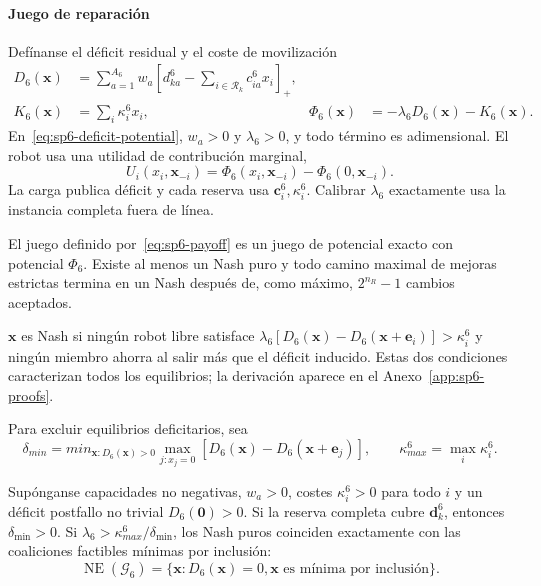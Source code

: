 \paragraph{Juego de reparación}

Defínanse el déficit residual y el coste de movilización
\begin{equation}
\label{eq:sp6-deficit-potential}
\begin{aligned}
 D_6(\boldsymbol x)
 &=\sum_{a=1}^{A_6}w_a
 \left[d_{ka}^6-\sum_{i\in\mathcal R_k}c_{ia}^6x_i\right]_+,\\
 K_6(\boldsymbol x)&=\sum_i\kappa_i^6x_i,
 &\Phi_6(\boldsymbol x)&=-\lambda_6D_6(\boldsymbol x)-K_6(\boldsymbol x).
\end{aligned}
\end{equation}
En~\eqref{eq:sp6-deficit-potential}, $w_a>0$ y $\lambda_6>0$, y todo término es adimensional. El robot usa una utilidad de contribución marginal,
\begin{equation}
\label{eq:sp6-payoff}
 U_i(x_i,\boldsymbol x_{-i})=
 \Phi_6(x_i,\boldsymbol x_{-i})-\Phi_6(0,\boldsymbol x_{-i}).
\end{equation}
La carga publica déficit y cada reserva usa $\boldsymbol c_i^6,\kappa_i^6$. Calibrar $\lambda_6$ exactamente usa la instancia completa fuera de línea.

\begin{teorema}
\label{thm:sp6-exact-potential}
El juego definido por~\eqref{eq:sp6-payoff} es un juego de potencial exacto con potencial $\Phi_6$. Existe al menos un Nash puro y todo camino maximal de mejoras estrictas termina en un Nash después de, como máximo, $2^{n_R}-1$ cambios aceptados.
\end{teorema}

$\boldsymbol x$ es Nash si ningún robot libre satisface
$\lambda_6[D_6(\boldsymbol x)-D_6(\boldsymbol x+\boldsymbol e_i)]>\kappa_i^6$
y ningún miembro ahorra al salir más que el déficit inducido. Estas dos condiciones caracterizan todos los equilibrios; la derivación aparece en el Anexo~\ref{app:sp6-proofs}.

Para excluir equilibrios deficitarios, sea
\begin{equation}
\label{eq:sp6-delta-min}
 \delta_{min}=min_{\boldsymbol x:D_6(\boldsymbol x)>0}
 \max_{j:x_j=0}\left[D_6(\boldsymbol x)-D_6(\boldsymbol x+\boldsymbol e_j)\right],
 \qquad
 \kappa_{max}^6=\max_i\kappa_i^6.
\end{equation}

\begin{teorema}
\label{thm:sp6-feasible-nash}
Supónganse capacidades no negativas, $w_a>0$, costes $\kappa_i^6>0$ para todo $i$ y un déficit postfallo no trivial $D_6(\boldsymbol0)>0$. Si la reserva completa cubre $\boldsymbol d_k^6$, entonces $\delta_{\min}>0$. Si $\lambda_6>\kappa_{max}^6/\delta_{\min}$, los Nash puros coinciden exactamente con las coaliciones factibles mínimas por inclusión:
\[
 \operatorname{NE}(\mathcal G_6)=
 \{\boldsymbol x:D_6(\boldsymbol x)=0,
   \boldsymbol x\text{ es mínima por inclusión}\}.
\]
\end{teorema}

